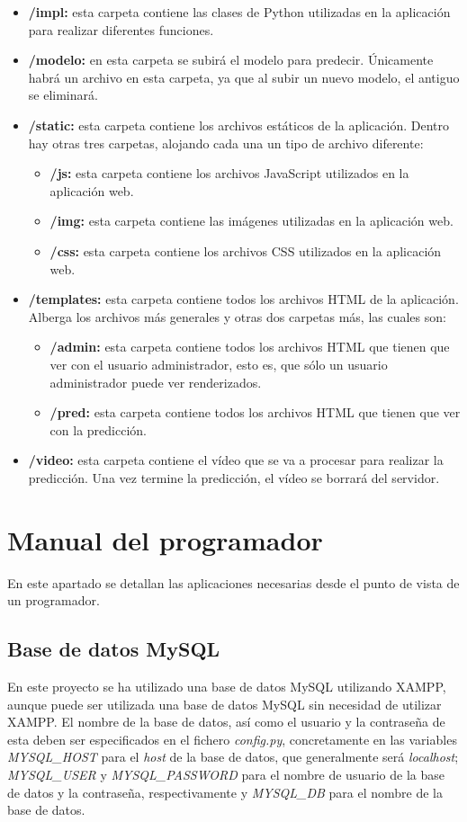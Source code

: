 \begin{itemize}
	\item \textbf{/impl:} esta carpeta contiene las clases de Python utilizadas en la aplicación para realizar diferentes funciones.
	\item \textbf{/modelo:} en esta carpeta se subirá el modelo para predecir. Únicamente habrá un archivo en esta carpeta, ya que al subir un nuevo modelo, el antiguo se eliminará.
	\item \textbf{/static:} esta carpeta contiene los archivos estáticos de la aplicación. Dentro hay otras tres carpetas, alojando cada una un tipo de archivo diferente:
	\begin{itemize}
		\item \textbf{/js:} esta carpeta contiene los archivos JavaScript utilizados en la aplicación web.
		\item \textbf{/img:} esta carpeta contiene las imágenes utilizadas en la aplicación web.
		\item \textbf{/css:} esta carpeta contiene los archivos CSS utilizados en la aplicación web.
	\end{itemize}
	\item \textbf{/templates:} esta carpeta contiene todos los archivos HTML de la aplicación. Alberga los archivos más generales y otras dos carpetas más, las cuales son:
	\begin{itemize}
		\item \textbf{/admin:} esta carpeta contiene todos los archivos HTML que tienen que ver con el usuario administrador, esto es, que sólo un usuario administrador puede ver renderizados.
		\item \textbf{/pred:} esta carpeta contiene todos los archivos HTML que tienen que ver con la predicción.
	\end{itemize}
	\item \textbf{/video:} esta carpeta contiene el vídeo que se va a procesar para realizar la predicción. Una vez termine la predicción, el vídeo se borrará del servidor.
\end{itemize}

\section{Manual del programador}
En este apartado se detallan las aplicaciones necesarias desde el punto de vista de un programador.

\subsection{Base de datos MySQL}
En este proyecto se ha utilizado una base de datos MySQL utilizando XAMPP, aunque puede ser utilizada una base de datos MySQL sin necesidad de utilizar XAMPP. El nombre de la base de datos, así como el usuario y la contraseña de esta deben ser especificados en el fichero \textit{config.py}, concretamente en las variables \textit{MYSQL\_HOST} para el \textit{host} de la base de datos, que generalmente será \textit{localhost}; \textit{MYSQL\_USER} y \textit{MYSQL\_PASSWORD} para el nombre de usuario de la base de datos y la contraseña, respectivamente y \textit{MYSQL\_DB} para el nombre de la base de datos.

